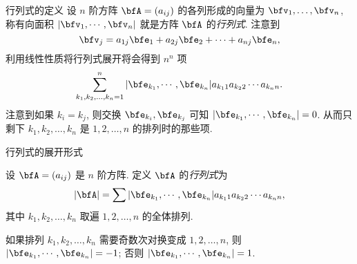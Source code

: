 

\begin{frame}{行列式的定义\noexer}
	\onslide<+->
	设 $n$ 阶方阵 $\bfA=(a_{ij})$ 的各列形成的向量为 $\bfv_1,\dots,\bfv_n$,
	\onslide<+->
	称有向面积 $|\bfv_1,\cdots,\bfv_n|$ 就是方阵 $\bfA$ 的\emph{行列式}.
	\onslide<+->
	注意到
	\[\bfv_j=a_{1j}\bfe_1+a_{2j}\bfe_2+\cdots+a_{nj}\bfe_n,\]
	\onslide<+->
	利用线性性质将行列式展开将会得到 $n^n$ 项
	\[\sum_{k_1,k_2,\dots,k_n=1}^n|\bfe_{k_1},\cdots,\bfe_{k_n}| a_{k_11}a_{k_22}\cdots a_{k_nn}.\]
	\onslide<+->
	注意到如果 $k_i=k_j$, 则交换 $\bfe_{k_i},\bfe_{k_j}$ 可知 $|\bfe_{k_1},\cdots,\bfe_{k_n}|=0$.
	\onslide<+->
	从而只剩下 $k_1,k_2,\dots,k_n$ 是 $1,2,\dots,n$ 的排列时的那些项.
	\end{frame}
	
	
	\begin{frame}{行列式的展开形式\noexer}
	\onslide<+->
	\begin{definition}
		设 $\bfA=(a_{ij})$ 是 $n$ 阶方阵.
		定义 $\bfA$ 的\emph{行列式}为
		\[|\bfA|=\sum |\bfe_{k_1},\cdots,\bfe_{k_n}| a_{k_11}a_{k_22}\cdots a_{k_nn},\]
		其中 $k_1,k_2,\dots,k_n$ 取遍 $1,2,\dots,n$ 的全体排列.
	\end{definition}
	\onslide<+->
	如果排列 $k_1,k_2,\dots,k_n$ 需要奇数次对换变成 $1,2,\dots,n$, 则 
	$|\bfe_{k_1},\cdots,\bfe_{k_n}|=-1$; 否则 $|\bfe_{k_1},\cdots,\bfe_{k_n}|=1$.
\end{frame}


